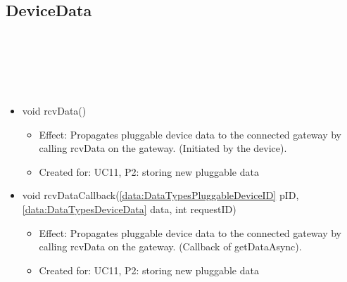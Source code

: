   \subsection{DeviceData}\label{int:MoteMoteFacadeDeviceData}
    \begin{description}
      \item[Provided by:] \iconcomponent{}~
      \item[Required by:] \iconcomponent{}~
      \item[Operations:] ~
    \begin{itemize}[noitemsep,nolistsep,leftmargin=-.25cm]
      \item \textsf{void rcvData()}
        \begin{itemize}[noitemsep,nolistsep]
           \item Effect: Propagates pluggable device data to the connected gateway by calling rcvData on the gateway. (Initiated by the device).
\item Created for: UC11, P2: storing new pluggable data
        \end{itemize}
      \item \textsf{void rcvDataCallback(\ref{data:DataTypesPluggableDeviceID} pID, \ref{data:DataTypesDeviceData} data, int requestID)}
        \begin{itemize}[noitemsep,nolistsep]
           \item Effect: Propagates pluggable device data to the connected gateway by calling rcvData on the gateway. (Callback of getDataAsync).
\item Created for: UC11, P2: storing new pluggable data
        \end{itemize}
    \end{itemize}
    \end{description}

